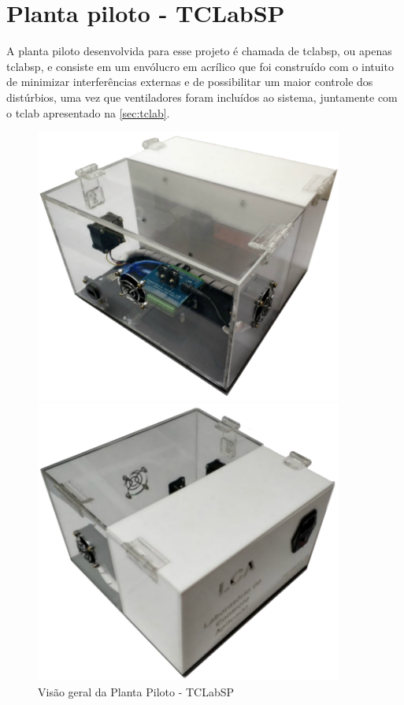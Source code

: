 \section{Planta piloto - TCLabSP}
\label{sec:planta_piloto}

A planta piloto desenvolvida para esse projeto é chamada de \acrlong{tclabsp}, ou apenas \acrshort{tclabsp},
e consiste em um envólucro em acrílico que foi construído com o intuito de minimizar interferências
externas e de possibilitar um maior controle dos distúrbios, uma vez que ventiladores foram incluídos
ao sistema, juntamente com o \acrshort{tclab} apresentado na \cref{sec:tclab}.

\begin{figure}[h]
    \centering
	\caption{Visão geral da Planta Piloto - TCLabSP}
    \begin{minipage}{0.47\textwidth}
        \centering
        \includegraphics[width=0.9\textwidth]{./5_images/TCLabSP_1.png} 
    \end{minipage}\hfill
    \begin{minipage}{0.47\textwidth}
        \centering
        \includegraphics[width=0.9\textwidth]{./5_images/TCLabSP_2.png} 

\end{minipage}
\end{figure}

